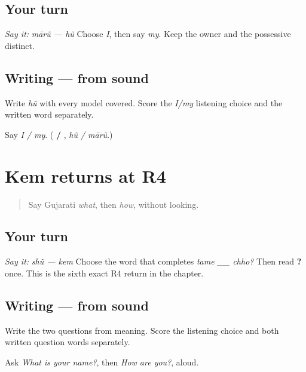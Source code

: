 \subsection*{Your turn}
\emph{Say it:} \emph{mārũ — hũ} Choose \emph{I}, then say \emph{my}. Keep the owner and the possessive distinct.

\subsection*{Writing — from sound}
Write \emph{hũ} with every model covered. Score the \emph{I/my} listening choice and the written word separately.

\begin{tcolorbox}[breakable,colback=teal!4,colframe=teal!35!black,title={Before you move on}]
Say \emph{I / my}. (\textbf{ / }, \emph{hũ / mārũ}.)
\end{tcolorbox}
\section[Practice]{Kem returns at R4}

\label{lesson:GU-R17-kem-r4}



\begin{quote}
Say Gujarati \emph{what}, then \emph{how}, without looking.
\end{quote}

\subsection*{Your turn}
\emph{Say it:} \emph{shũ — kem} Choose the word that completes \emph{tame \_\_ chho?} Then read \textbf{  ?} once. This is the sixth exact R4 return in the chapter.

\subsection*{Writing — from sound}
Write the two questions from meaning. Score the listening choice and both written question words separately.

\begin{tcolorbox}[breakable,colback=teal!4,colframe=teal!35!black,title={Before you move on}]
Ask \emph{What is your name?}, then \emph{How are you?}, aloud.
\end{tcolorbox}
